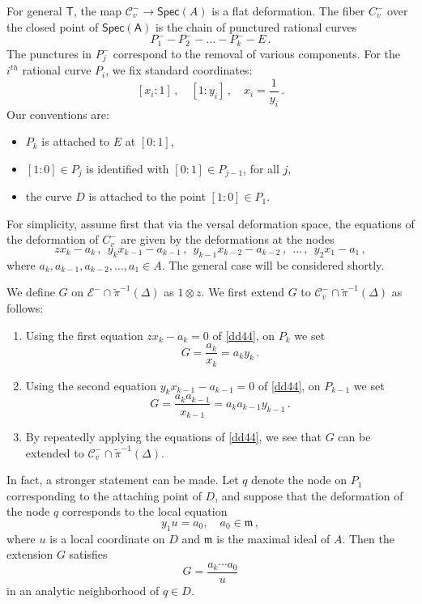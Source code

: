 \documentclass[11pt]{amsart}
\theoremstyle{definition}
\renewcommand{\tilde}{\widetilde}
\begin{document}
{For general $\mathsf {T}$, the map 
$\mathcal {C}^-_v \rightarrow \mathsf{Spec}(A)$
is a flat deformation.  
The fiber $C_v^-$ over the closed point of $\mathsf{Spec(A)}$ is the chain of punctured rational curves
$$P_1^- -P_2^--\ldots - P_k^--E\,.$$ The punctures in $P_j^-$ correspond to the removal of various components. For the $i^{th}$ rational curve $P_i$, we fix standard coordinates:
$$[x_i:1]\,,\quad [1:y_i]\,, \quad x_i=\frac{1}{y_i}\, .$$
Our conventions are: 
\begin{itemize}
   \item $P_k$ is attached to $E$ at   $[0:1]$,
\item $[1:0]\in P_j$ is identified with $[0:1]\in P_{j-1}$, for all $j$,
\item the curve $D$ is attached to the point $[1:0]\in P_1$.
\end{itemize}
For simplicity, assume first that via the versal deformation space,
the equations of the deformation of $C^{-}_v$ are given by the deformations
at the nodes
\begin{equation} \label{dd44}
zx_k-a_k\, ,\ \  y_kx_{k-1}-a_{k-1}\, ,\ \ y_{k-1}x_{k-2} - a_{k-2}\, , \ \ \ldots \, , \ \ 
y_2x_1 - a_1\,, 
\end{equation}
where $a_k,a_{k-1},a_{k-2}, \ldots, a_1 \in A$.
The general case will be considered shortly. 

We define $G$ on $\mathcal E^- \cap \tilde \pi^{-1}(\Delta)$ as $1\otimes z$. We first extend
$G$ to ${\mathcal C}^-_v\cap \tilde \pi^{-1}(\Delta)$ as follows: 
\begin{enumerate}
\item[$\bullet$] Using the first equation $zx_k-a_k=0$ of \eqref{dd44}, on $P_k$ we set 
$$G = \frac{a_k}{x_k} = a_k y_k\,.$$
\item[$\bullet$] Using the second equation $y_kx_{k-1}-a_{k-1}=0$ of \eqref{dd44}, on $P_{k-1}$ we set
$$G= \frac{a_ka_{k-1}}{x_{k-1}} = a_k a_{k-1} y_{k-1}\,.$$
\item[$\bullet$] By repeatedly applying the equations
 of \eqref{dd44}, we see that
$G$ can be extended
to $\mathcal {C}_v^-\cap \tilde \pi^{-1}(\Delta)$.
\end{enumerate}
In fact, a stronger statement can be made. Let $q$ denote the node on $P_1$ corresponding to the attaching point of $D$, and suppose that the deformation of the node $q$ corresponds to the local equation $$y_1u=a_0, \quad a_0\in \mathfrak m\,,$$ where $u$ is a local coordinate on $D$ and $\mathfrak{m}$ is the maximal ideal of $A$. Then the extension $G$ satisfies $$G=\frac{a_k\cdots a_0}{u}$$ in an analytic neighborhood of $q\in D$. 

}
\end{document}
